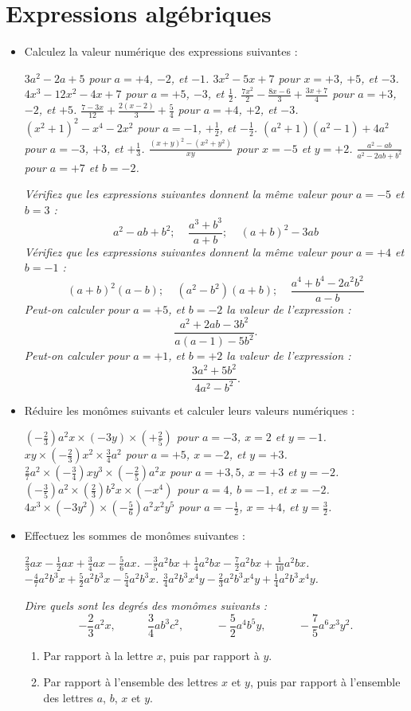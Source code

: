 \chapter{Expressions algébriques}
 
\begin{itemize}
\item Calculez la valeur numérique des expressions suivantes : 
\begin{itemize}
\it $3a^2-2a+5$ pour $a =  +4$, $-2$, et $-1$.
\it $3x^2-5x+7$ pour $x =  +3$, $+5$, et $-3$.
\it $4x^3-12x^2-4x+7$ pour $a =  +5$, $-3$, et $\frac12$.
\it $\frac{7x^2}2- \frac{8x-6}3 + \frac{3x+7}4$ pour $a =  +3$, $-2$, et $+5$.
\it $\frac{7-3x}{12}+\frac{2(x-2)}3 +\frac54$ pour $a =  +4$, $+2$, et $-3$.
\it $(x^2+1)^2 - x^4 -2x^2$ pour $a =  -1$, $+\frac12$, et $-\frac12$.
\it $(a^2+1)(a^2-1) + 4a^2$ pour $a =  -3$, $+3$, et $+\frac13$.
\it $\frac{(x+y)^2-(x^2+y^2)}{xy}$ pour $x=-5$ et $y=+2$.
\it $\frac{a^2-ab}{a^2-2ab+b^2}$ pour $a=+7$ et $b=-2$.
\end{itemize}
\it Vérifiez que les expressions suivantes donnent la même valeur pour $a=-5$ et $b=3$ : 
\[ a^2 - ab + b^2; \ \ \ \ \ \frac{a^3+b^3}{a+b}; 
\ \ \ \ \ (a+b)^2-3ab\]
\it Vérifiez que les expressions suivantes donnent la même valeur pour $a=+4$ et $b=-1$ : 
\[ (a+b)^2(a-b); \ \ \ \ \ (a^2-b^2)(a+b); 
\ \ \ \ \ \frac{a^4+b^4-2a^2b^2}{a-b}\]
\it Peut-on calculer pour $a=+5$, et $b=-2$ la valeur de l'expression : \[ \frac{a^2+2ab-3b^2}{a(a-1)-5b^2}.\]
\it Peut-on calculer pour $a=+1$, et $b=+2$ la valeur de l'expression : \[ \frac{3a^2+5b^2}{4a^2-b^2}.\]
\item Réduire les monômes suivants et calculer leurs valeurs numériques :
\begin{itemize}
\it $\left(-\frac23\right) a^2x \times (-3y) \times \left(+\frac25\right)$ pour $a=-3$, $x=2$ et $y=-1$. 
\it $xy \times \left(-\frac23\right)x^2\times \frac34a^2$ pour $a=+5$, $x=-2$, et $y=+3$.
\it $\frac27a^2\times\left(-\frac34\right)xy^3\times \left(-\frac25\right)a^2x$ pour $a=+3,5$, $x=+3$ et $y=-2$. 
\it $\left(-\frac35\right)a^2 \times \left(\frac23\right)b^2x \times (-x^4)$ pour $a=4$, $b=-1$, et $x=-2$. 
\it $4x^3 \times (-3y^2) \times \left(-\frac56\right) a^2x^2y^5$ pour $a=-\frac12$, $x=+4$, et $y=\frac32$. 
\end{itemize}
\item Effectuez les sommes de monômes suivantes : 
\begin{itemize}
\it $\frac23ax-\frac12ax+\frac34ax-\frac56ax$.
\it $-\frac35a^2bx+\frac14a^2bx-\frac72a^2bx+\frac1{10}a^2bx$.
\it $-\frac47a^2b^3x+\frac52a^2b^3x-\frac54a^2b^3x$.
\it $\frac34a^2b^3x^4y-\frac23a^2b^3x^4y+\frac14a^2b^3x^4y$. 
\end{itemize}
\it Dire quels sont les degrés des monômes suivants : 
\[ - \frac23a^2x,\phantom{miaou}
\frac34ab^3c^2,\phantom{miaou}
-\frac52a^4b^5y,\phantom{miaou}
-\frac75a^6x^3y^2.\]
\begin{enumerate}
\item Par rapport à la lettre $x$, puis par rapport à $y$. 
\item Par rapport à l'ensemble des lettres $x$ et $y$, puis par rapport à l'ensemble des lettres $a$, $b$, $x$ et $y$.
\end{enumerate}
\end{itemize}